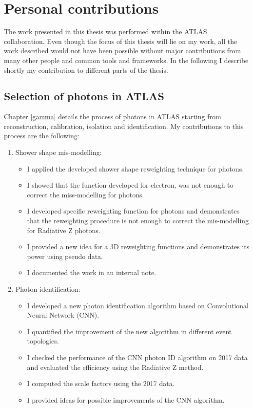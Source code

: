 \newpage
\chapter*{Personal contributions}

The work presented in this thesis was performed within the ATLAS collaboration. Even though the focus of this thesis will lie on my work, all the work described would not have been possible without major contributions from many other people and common tools and frameworks. In the following I describe shortly my contribution to different parts of the thesis. 

\section*{Selection of photons in ATLAS}

Chapter \ref{gamma} details the process of photons in ATLAS starting from reconstruction, calibration, isolation and identification. My contributions to this process are the following:

\begin{enumerate}
    \item Shower shape mis-modelling: 
\begin{itemize}
    \item I applied the developed shower shape reweighting technique for photons. 
    \item I showed that the function developed for electron, was not enough to correct the miss-modelling for photons. 
    \item I developed specific reweighting function for photons and demonstrates that the reweighting procedure is not enough to correct the mis-modelling for Radiative Z photons. 
    \item I provided a new idea for a 3D reweighting functions and demonstrates its power using pseudo data.
    \item I documented the work in an internal note.
 
\end{itemize}

\item Photon identification: 
\begin{itemize}
    \item I developed a new photon identification algorithm based on Convolutional Neural Network (CNN).
    \item I quantified the improvement of the new algorithm in different event topologies. 
    \item I checked the performance of the CNN photon ID algorithm on 2017 data and evaluated the efficiency using the Radiative Z method. 
    \item I computed the scale factors using the 2017 data. 
    \item I provided ideas for possible improvements of the CNN algorithm.
\end{itemize}
\end{enumerate}

